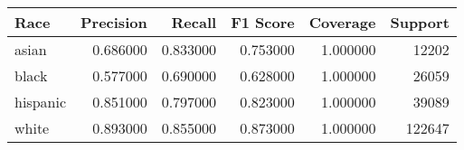 \begin{tabular}{lrrrrr}
\toprule
Race & Precision & Recall & F1 Score & Coverage & Support \\
\midrule
asian & 0.686000 & 0.833000 & 0.753000 & 1.000000 & 12202 \\
black & 0.577000 & 0.690000 & 0.628000 & 1.000000 & 26059 \\
hispanic & 0.851000 & 0.797000 & 0.823000 & 1.000000 & 39089 \\
white & 0.893000 & 0.855000 & 0.873000 & 1.000000 & 122647 \\
\bottomrule
\end{tabular}
